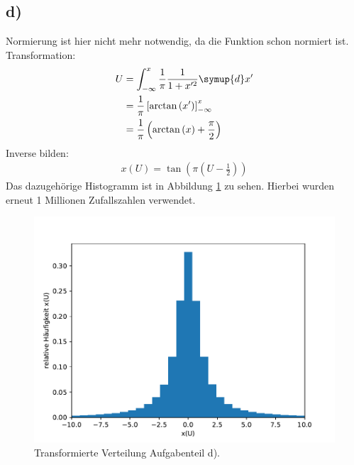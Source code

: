 \subsection{d)}
Normierung ist hier nicht mehr notwendig, da die Funktion schon normiert ist.
Transformation:
\begin{align*}
  U &= \int_{-\infty}^{x} \frac{1}{\pi} \frac{1}{1+x'^2} \symup{d}x' \\
  &= \frac{1}{\pi} \left[ \arctan{(x')} \right]_{-\infty}^{x} \\
  &= \frac{1}{\pi} \left( \arctan{(x)}+ \frac{\pi}{2} \right)
\end{align*}
Inverse bilden:
\begin{align*}
  x(U) = \tan{\left( \pi \left(U-\frac{1}{2} \right) \right)}
\end{align*}
Das dazugehörige Histogramm ist in Abbildung \ref{5.d} zu sehen. Hierbei wurden erneut 1 Millionen Zufallszahlen verwendet.
\begin{figure}[h]
  \centering
  \includegraphics[scale=0.7]{Aufgabe05/Transformierte4.pdf}
  \caption{Transformierte Verteilung Aufgabenteil d).}
  \label{5.d}
\end{figure}

